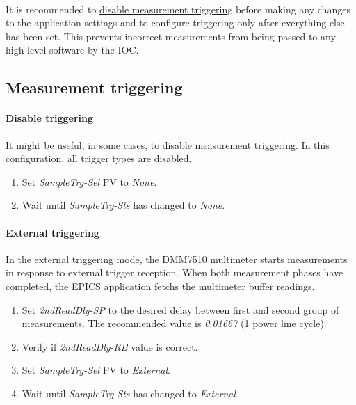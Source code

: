 \documentclass[openany]{article}
\begin{document}
	\paragraph{} It is recommended to \hyperref[disable-triggering]{disable measurement triggering} before making any changes to the application settings and to configure triggering only after everything else has been set. This prevents incorrect measurements from being passed to any high level software by the IOC.

	\subsection{Measurement triggering}

		\paragraph{Disable triggering}\label{disable-triggering} It might be useful, in some cases, to disable measurement triggering. In this configuration, all trigger types are disabled.

			\begin{enumerate}
				\item Set \emph{SampleTrg-Sel} PV to \emph{None}.
				\item Wait until \emph{SampleTrg-Sts} has changed to \emph{None}.
			\end{enumerate}

		\paragraph{External triggering} In the external triggering mode, the DMM7510 multimeter starts measurements in response to external trigger reception. When both measurement phases have completed, the EPICS application fetchs the multimeter buffer readings.

			\begin{enumerate}
				\item Set \emph{2ndReadDly-SP} to the desired delay between first and second group of measurements. The recommended value is \emph{0.01667} (1 power line cycle).
				\item Verify if \emph{2ndReadDly-RB} value is correct.
				\item Set \emph{SampleTrg-Sel} PV to \emph{External}.
				\item Wait until \emph{SampleTrg-Sts} has changed to \emph{External}.
			\end{enumerate}
\end{document}
